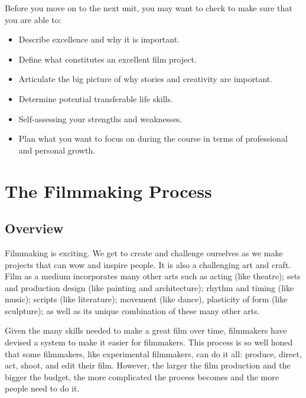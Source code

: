 \documentclass[
]{book}
\providecommand{\tightlist}{%
  \setlength{\itemsep}{0pt}\setlength{\parskip}{0pt}}
\begin{document}
\begin{progress}
Before you move on to the next unit, you may want to check to make sure that you are able to:

\begin{itemize}
\tightlist
\item
  Describe excellence and why it is important.\\
\item
  Define what constitutes an excellent film project.\\
\item
  Articulate the big picture of why stories and creativity are important.\\
\item
  Determine potential transferable life skills.\\
\item
  Self-assessing your strengths and weaknesses.\\
\item
  Plan what you want to focus on during the course in terms of professional and personal growth.
\end{itemize}
\end{progress}

\hypertarget{the-filmmaking-process}{%
\chapter{The Filmmaking Process}\label{the-filmmaking-process}}

\hypertarget{overview-1}{%
\section*{Overview}\label{overview-1}}

Filmmaking is exciting. We get to create and challenge ourselves as we make projects that can wow and inspire people. It is also a challenging art and craft. Film as a medium incorporates many other arts such as acting (like theatre); sets and production design (like painting and architecture); rhythm and timing (like music); scripts (like literature); movement (like dance), plasticity of form (like sculpture); as well as its unique combination of these many other arts.

Given the many skills needed to make a great film over time, filmmakers have devised a system to make it easier for filmmakers. This process is so well honed that some filmmakers, like experimental filmmakers, can do it all: produce, direct, act, shoot, and edit their film. However, the larger the film production and the bigger the budget, the more complicated the process becomes and the more people need to do it.
\end{document}
